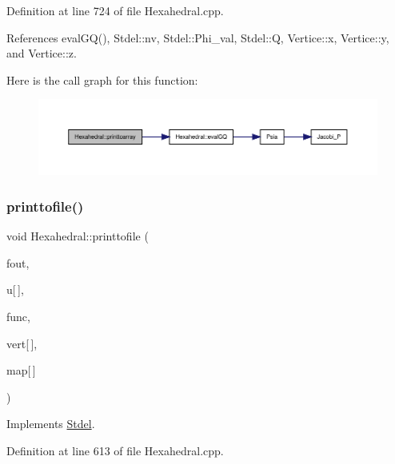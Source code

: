 Definition at line 724 of file Hexahedral.\+cpp.



References eval\+G\+Q(), Stdel\+::nv, Stdel\+::\+Phi\+\_\+val, Stdel\+::Q, Vertice\+::x, Vertice\+::y, and Vertice\+::z.

Here is the call graph for this function\+:
\nopagebreak
\begin{figure}[H]
\begin{center}
\leavevmode
\includegraphics[width=350pt]{classHexahedral_a5e18ffc000cd95595f652d67ce21eeac_cgraph}
\end{center}
\end{figure}
\mbox{\label{classHexahedral_a062fb995d31193f800fbf12ff7f19571}} 
\subsubsection{\texorpdfstring{printtofile()}{printtofile()}\hspace{0.1cm}{\footnotesize\ttfamily [1/2]}}
{\footnotesize\ttfamily void Hexahedral\+::printtofile (\begin{DoxyParamCaption}\item[{F\+I\+LE $\ast$}]{fout,  }\item[{const double}]{u\mbox{[}$\,$\mbox{]},  }\item[{double($\ast$)(double, double, double)}]{func,  }\item[{const \hyperlink{structVertice}{Vertice}}]{vert\mbox{[}$\,$\mbox{]},  }\item[{const int}]{map\mbox{[}$\,$\mbox{]} }\end{DoxyParamCaption})\hspace{0.3cm}{\ttfamily [virtual]}}



Implements \hyperlink{classStdel_a315869f4c1fe1fdf4911c0d4ab092176}{Stdel}.



Definition at line 613 of file Hexahedral.\+cpp.



